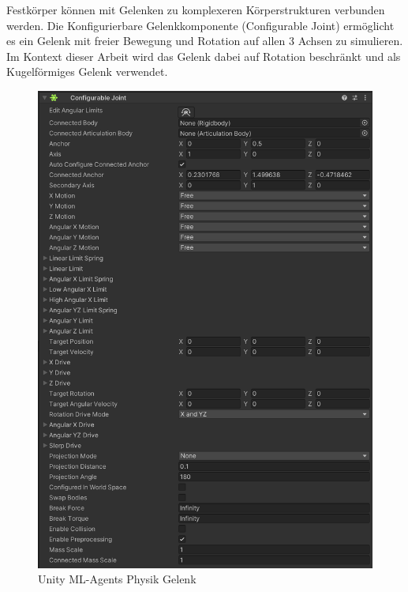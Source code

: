 Festkörper können mit Gelenken zu komplexeren Körperstrukturen verbunden werden. Die Konfigurierbare Gelenkkomponente (Configurable Joint) ermöglicht es ein Gelenk mit freier Bewegung und Rotation auf allen 3 Achsen zu simulieren. Im Kontext dieser Arbeit wird das Gelenk dabei auf Rotation beschränkt und als Kugelförmiges Gelenk verwendet.
\begin{figure}[H]
  \centering  
  \includegraphics[scale=0.5]{img/physik_gelenk.png}
  \caption{Unity ML-Agents Physik Gelenk}
  \label{fig:physik_gelenk}
\end{figure}
